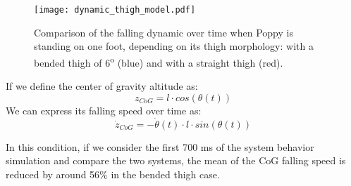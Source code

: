 \begin{figure}[thpb]
    \centering
    \texttt{[image: dynamic\_thigh\_model.pdf]}
    \caption{Comparison of the falling dynamic over time when Poppy is standing on one foot, depending on its thigh morphology: with a bended thigh of 6\textsuperscript{o} (blue) and with a straight thigh (red).}
    \label{fig:dynamic_thigh_model}
\end{figure}

If we define the center of gravity altitude as:
\begin{equation}
    z_{CoG} = l \cdot cos(\theta(t))
\end{equation}
We can express its falling speed over time as:
\begin{equation}
    \dot{z}_{CoG} = - \dot{\theta}(t) \cdot l \cdot sin(\theta(t))
\end{equation}

In this condition, if we consider the first 700 ms of the system behavior simulation and compare the two systems, the mean of the CoG falling speed is reduced by around 56\% in the bended thigh case.


